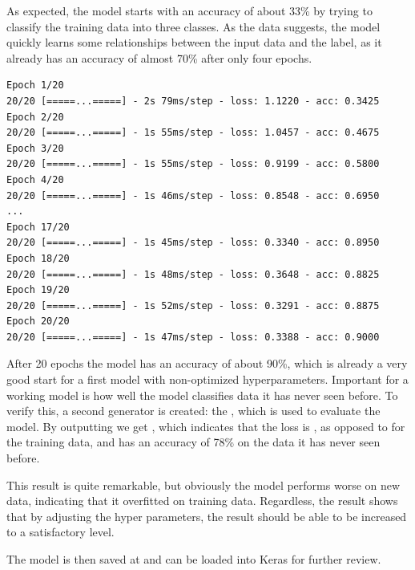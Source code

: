 As expected, the model starts with an accuracy of about 33\% by trying to classify the training data into three classes.
As the data suggests, the model quickly learns some relationships between the input data and the label, as it already has an accuracy of almost 70\% after only four epochs.

\begin{lstlisting}
Epoch 1/20
20/20 [=====...=====] - 2s 79ms/step - loss: 1.1220 - acc: 0.3425
Epoch 2/20
20/20 [=====...=====] - 1s 55ms/step - loss: 1.0457 - acc: 0.4675
Epoch 3/20
20/20 [=====...=====] - 1s 55ms/step - loss: 0.9199 - acc: 0.5800
Epoch 4/20
20/20 [=====...=====] - 1s 46ms/step - loss: 0.8548 - acc: 0.6950
...
Epoch 17/20
20/20 [=====...=====] - 1s 45ms/step - loss: 0.3340 - acc: 0.8950
Epoch 18/20
20/20 [=====...=====] - 1s 48ms/step - loss: 0.3648 - acc: 0.8825
Epoch 19/20
20/20 [=====...=====] - 1s 52ms/step - loss: 0.3291 - acc: 0.8875
Epoch 20/20
20/20 [=====...=====] - 1s 47ms/step - loss: 0.3388 - acc: 0.9000
\end{lstlisting}

After 20 epochs the model has an accuracy of about 90\%, which is already a very good start for a first model with non-optimized hyperparameters.
Important for a working model is how well the model classifies data it has never seen before.
To verify this, a second generator is created: the , which is used to evaluate the model.
By outputting  we get \code{[0.6071663084129493, 0.7866667]}, which indicates that the loss is , as opposed to  for the training data, and has an accuracy of 78\% on the data it has never seen before.

This result is quite remarkable, but obviously the model performs worse on new data, indicating that it overfitted on training data.
Regardless, the result shows that by adjusting the hyper parameters, the result should be able to be increased to a satisfactory level.

The model is then saved at  and can be loaded into Keras for further review.